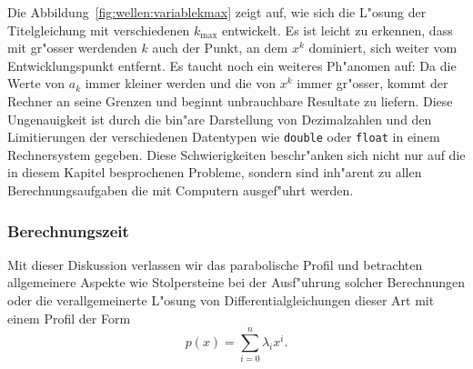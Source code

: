 Die Abbildung~\ref{fig:wellen:variablekmax} zeigt auf, wie sich die L"osung 
der Titelgleichung mit verschiedenen $k_{\text{max}}$ entwickelt. Es ist leicht 
zu erkennen, dass mit gr"osser werdenden $k$ auch der Punkt, an dem $x^k$ 
dominiert, sich weiter vom Entwicklungspunkt entfernt. Es taucht noch ein 
weiteres Ph"anomen auf: Da die Werte von $a_k$ immer kleiner werden und die von 
$x^k$ immer gr"osser, kommt der Rechner an seine Grenzen und beginnt 
unbrauchbare Resultate zu liefern. Diese Ungenauigkeit ist durch die bin"are 
Darstellung von Dezimalzahlen und den Limitierungen der verschiedenen 
Datentypen wie \texttt{double} oder \texttt{float} in einem Rechnersystem 
gegeben. Diese Schwierigkeiten beschr"anken sich nicht nur auf die in diesem 
Kapitel besprochenen Probleme, sondern sind inh"arent zu allen 
Berechnungsaufgaben die mit Computern ausgef"uhrt werden.

\subsubsection{Berechnungszeit}
%





Mit dieser Diskussion verlassen wir das parabolische Profil und betrachten 
allgemeinere Aspekte wie Stolpersteine bei der Ausf"uhrung solcher Berechnungen 
oder die verallgemeinerte L"osung von Differentialgleichungen 
dieser Art mit einem Profil der Form
\begin{equation*}
p(x) = \sum_{i=0}^{n} \lambda_i x^i.
\end{equation*}

